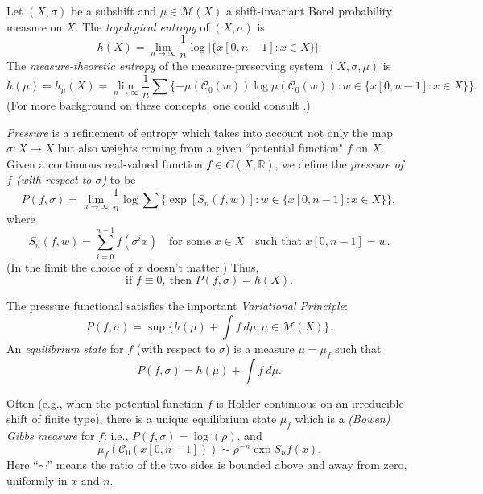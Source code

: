 \documentclass{kepart2010}
\theoremstyle{plain}
\theoremstyle{definition}
\theoremstyle{remark}
\theoremstyle{definition}
\numberwithin{equation}{section}
\begin{document}
Let $(X,\sigma )$ be a subshift and $\mu \in \mathcal M(X)$ a
shift-invariant Borel probability measure on $X$. The {\em
topological entropy} of $(X,\sigma)$ is
 \begin{equation} h(X)= \lim_{n\to\infty} \frac1n\log|\{x[0,n-1]:x\in X\}|.
 \end{equation}
 The {\em measure-theoretic entropy}
of the measure-preserving system $(X,\sigma,\mu)$ is
 \begin{equation} h(\mu)=h_{\mu}(X) =\lim_{n\to\infty} \frac 1n
 \sum \{-\mu ({{\mathcal C}}_0(w))\log \mu ({{\mathcal C}}_0(w)):w \in
 \{x[0,n-1]: x\in X\}\} .
 \end{equation}
 (For more background on these concepts,
one could consult \cite{Petersen1989,Walters1982}.)

{\em Pressure} is a refinement of entropy which takes into account
not only the map $\sigma: X\to X$ but also weights coming from a
given ``potential function" $f$ on $X$. Given a continuous
real-valued function $f\in C(X, \mathbb R)$, we define the {\em
pressure of $f$ (with respect to $\sigma$)} to be
 \begin{equation}
 P(f,\sigma) = \lim_{n\to\infty} \frac 1n \log \sum
 \{\exp[S_n(f,w)]:w
\in \{x[0,n-1]: x\in X\}\},
\end{equation}
where
 \begin{equation}
 S_n(f,w) =\sum_{i=0}^{n-1} f(\sigma^i x)
 \quad\text{for some }x\in X
 \quad\text{such that } x[0,n-1]=w .
 \end{equation}
 (In the limit the choice of
$x$ doesn't matter.) Thus,
 \begin{equation} \text{if } f \equiv 0,
\ \text{then } P(f,\sigma )=
h(X) .
\end{equation}

The pressure functional satisfies the important {\em
Variational Principle}:
 \begin{equation} P(f,\sigma ) = \sup \{ h(\mu) + \int f
\ d\mu : \mu \in \mathcal M(X)\} .
 \end{equation}
 An {\em equilibrium state}
for $f$ (with respect to $\sigma$) is a measure $\mu = \mu_f$ such
that
 \begin{equation} P(f,\sigma) = h(\mu) + \int f \ d\mu .
  \end{equation}

{ Often (e.g., when the potential function $f$ is H\"older
continuous on an irreducible shift of finite type), there is a
unique equilibrium state $\mu_f$ which is a {\em (Bowen) Gibbs
measure} for $f$: i.e.,
 $P(f,\sigma )= \log (\rho )$, and
 \begin{equation} \label{Eq_BowenGibbs}
 \mu_f ({{\mathcal C}}_0(x[0,n-1])) \sim
\rho^{-n}\exp S_nf(x) . \end{equation}
Here ``$\sim$'' means the ratio of the
two sides is bounded above and away from zero,
 uniformly in $x$ and $n$.
}
\end{document}
